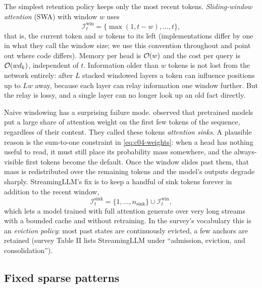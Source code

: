 The simplest retention policy keeps only the most recent tokens. \emph{Sliding-window attention}
(SWA) with window $w$ uses
\begin{equation}\label{eq:c04-swa}
  \mathcal{I}^{\mathrm{win}}_t = \{\max(1,t-w),\dots,t\},
\end{equation}
that is, the current token and $w$ tokens to its left (implementations differ by one in what
they call the window size; we use this convention throughout and point out where code differs).
Memory per head is $\mathcal{O}(w)$ and the cost per query is $\mathcal{O}(w d_k)$, independent of $t$.
Information older than $w$ tokens is not lost from the network entirely: after $L$ stacked
windowed layers a token can influence positions up to $Lw$ away, because each layer can relay
information one window further. But the relay is lossy, and a single layer can no longer look
up an old fact directly.

Naive windowing has a surprising failure mode. \citet{xiao2023streamingllm} observed that
pretrained models put a large share of attention weight on the first few tokens of the sequence,
regardless of their content. They called these tokens \emph{attention sinks}. A plausible reason
is the sum-to-one constraint in \eqref{eq:c04-weights}: when a head has nothing useful to read,
it must still place its probability mass somewhere, and the always-visible first tokens become
the default. Once the window slides past them, that mass is redistributed over the remaining
tokens and the model's outputs degrade sharply. StreamingLLM's fix is to keep a handful of sink
tokens forever in addition to the recent window,
\begin{equation}\label{eq:c04-sink}
  \mathcal{I}^{\mathrm{sink}}_t = \{1,\dots,n_{\mathrm{sink}}\}\cup\mathcal{I}^{\mathrm{win}}_t,
\end{equation}
which lets a model trained with full attention generate over very long streams with a bounded
cache and without retraining. In the survey's vocabulary this is an \emph{eviction policy}: most
past states are continuously evicted, a few anchors are retained (survey Table II lists
StreamingLLM under ``admission, eviction, and consolidation'').

\subsection{Fixed sparse patterns}\label{sec:c04-fixed}

